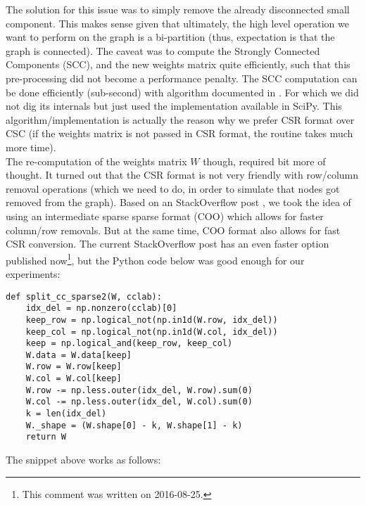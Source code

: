 The solution for this issue was to simply remove the already
disconnected small component. This makes sense given that ultimately,
the high level operation we want to perform on the graph is a
bi-partition (thus, expectation is that the graph is connected). The
caveat was to compute the Strongly Connected Components (\gls{SCC}), and the
new weights matrix quite efficiently, such that this pre-processing
did not become a performance penalty. The \gls{SCC} computation can be done
efficiently (sub-second) with algorithm documented in \cite{pearce05}.
For which we did not dig its internals but just used the
implementation available in SciPy. This  
algorithm/implementation is actually the reason why we prefer CSR
format over CSC (if the weights matrix is not passed in CSR format,
the routine takes much more time). \\

\newpage
The re-computation of the weights matrix $W$ though, required bit more
of thought. It turned out that the CSR format is not very friendly
with row/column removal operations (which we need to do, in order to
simulate that nodes got removed from the graph). Based on an
StackOverflow post \cite{alim15}, we took the idea of using an
intermediate sparse sparse format (COO) which allows for faster
column/row removals. But at the same time, COO format also allows for
fast CSR conversion. The current StackOverflow post has an even faster option
published now\footnote{This comment was written on 2016-08-25.}, but the
Python code below was good enough for our experiments: 

    \begin{lstlisting}
def split_cc_sparse2(W, cclab):
    idx_del = np.nonzero(cclab)[0]
    keep_row = np.logical_not(np.in1d(W.row, idx_del))
    keep_col = np.logical_not(np.in1d(W.col, idx_del))
    keep = np.logical_and(keep_row, keep_col)
    W.data = W.data[keep]
    W.row = W.row[keep]
    W.col = W.col[keep]
    W.row -= np.less.outer(idx_del, W.row).sum(0)
    W.col -= np.less.outer(idx_del, W.col).sum(0)
    k = len(idx_del)
    W._shape = (W.shape[0] - k, W.shape[1] - k)
    return W
    \end{lstlisting}
    \joinbelow{1cm}
    
The snippet above works as follows: \\

